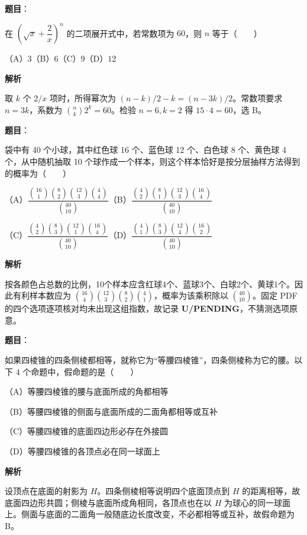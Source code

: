 \begin{answer}

\textbf{题目}：

在 $\left(\sqrt{x}+\dfrac2x\right)^n$ 的二项展开式中，若常数项为 $60$，则 $n$ 等于\mbox{（　　）}

（A）$3$\quad（B）$6$\quad（C）$9$\quad（D）$12$

\textbf{解析}

取 $k$ 个 $2/x$ 项时，所得幂次为 $(n-k)/2-k=(n-3k)/2$。常数项要求 $n=3k$，系数为 $\binom nk2^k=60$。检验 $n=6,k=2$ 得 $15\cdot4=60$，选 B。


\end{answer}
\begin{answer}

\textbf{题目}：

袋中有 40 个小球，其中红色球 16 个、蓝色球 12 个、白色球 8 个、黄色球 4 个，从中随机抽取 10 个球作成一个样本，则这个样本恰好是按分层抽样方法得到的概率为\mbox{（　　）}

（A）$\dfrac{\binom{16}{1}\binom{8}{2}\binom{12}{3}\binom{4}{4}}{\binom{40}{10}}$\quad（B）$\dfrac{\binom{4}{2}\binom{8}{1}\binom{12}{3}\binom{16}{4}}{\binom{40}{10}}$

（C）$\dfrac{\binom{4}{2}\binom{8}{3}\binom{12}{1}\binom{16}{4}}{\binom{40}{10}}$\quad（D）$\dfrac{\binom{4}{1}\binom{8}{3}\binom{12}{4}\binom{16}{2}}{\binom{40}{10}}$

\textbf{解析}

按各颜色占总数的比例，10个样本应含红球4个、蓝球3个、白球2个、黄球1个。因此有利样本数应为 $\binom{16}{4}\binom{12}{3}\binom82\binom41$，概率为该乘积除以 $\binom{40}{10}$。固定 PDF 的四个选项逐项核对均未出现这组指数，故记录 \textbf{U/PENDING}，不猜测选项原意。


\end{answer}
\begin{answer}

\textbf{题目}：

如果四棱锥的四条侧棱都相等，就称它为“等腰四棱锥”，四条侧棱称为它的腰。以下 4 个命题中，假命题的是\mbox{（　　）}

（A）等腰四棱锥的腰与底面所成的角都相等

（B）等腰四棱锥的侧面与底面所成的二面角都相等或互补

（C）等腰四棱锥的底面四边形必存在外接圆

（D）等腰四棱锥的各顶点必在同一球面上

\textbf{解析}

设顶点在底面的射影为 $H$。四条侧棱相等说明四个底面顶点到 $H$ 的距离相等，故底面四边形共圆；侧棱与底面所成角相同，各顶点也在以 $H$ 为球心的同一球面上。侧面与底面的二面角一般随底边长度改变，不必都相等或互补，故假命题为 B。


\end{answer}
